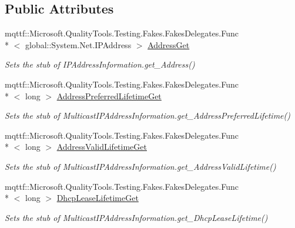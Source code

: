 \subsection*{Public Attributes}
\begin{DoxyCompactItemize}
\item 
mqttf\-::\-Microsoft.\-Quality\-Tools.\-Testing.\-Fakes.\-Fakes\-Delegates.\-Func\\*
$<$ global\-::\-System.\-Net.\-I\-P\-Address $>$ \hyperlink{class_system_1_1_net_1_1_network_information_1_1_fakes_1_1_stub_multicast_i_p_address_information_ae1a3769cede82dc0372388ea52785c37}{Address\-Get}
\begin{DoxyCompactList}\small\item\em Sets the stub of I\-P\-Address\-Information.\-get\-\_\-\-Address()\end{DoxyCompactList}\item 
mqttf\-::\-Microsoft.\-Quality\-Tools.\-Testing.\-Fakes.\-Fakes\-Delegates.\-Func\\*
$<$ long $>$ \hyperlink{class_system_1_1_net_1_1_network_information_1_1_fakes_1_1_stub_multicast_i_p_address_information_a896c7a33c99720be49dcd21db17f0f2e}{Address\-Preferred\-Lifetime\-Get}
\begin{DoxyCompactList}\small\item\em Sets the stub of Multicast\-I\-P\-Address\-Information.\-get\-\_\-\-Address\-Preferred\-Lifetime()\end{DoxyCompactList}\item 
mqttf\-::\-Microsoft.\-Quality\-Tools.\-Testing.\-Fakes.\-Fakes\-Delegates.\-Func\\*
$<$ long $>$ \hyperlink{class_system_1_1_net_1_1_network_information_1_1_fakes_1_1_stub_multicast_i_p_address_information_a99ec36a79f503e67b0bd8b1f383fe56f}{Address\-Valid\-Lifetime\-Get}
\begin{DoxyCompactList}\small\item\em Sets the stub of Multicast\-I\-P\-Address\-Information.\-get\-\_\-\-Address\-Valid\-Lifetime()\end{DoxyCompactList}\item 
mqttf\-::\-Microsoft.\-Quality\-Tools.\-Testing.\-Fakes.\-Fakes\-Delegates.\-Func\\*
$<$ long $>$ \hyperlink{class_system_1_1_net_1_1_network_information_1_1_fakes_1_1_stub_multicast_i_p_address_information_acd465f43a526ba33b00d37da8e61f489}{Dhcp\-Lease\-Lifetime\-Get}
\begin{DoxyCompactList}\small\item\em Sets the stub of Multicast\-I\-P\-Address\-Information.\-get\-\_\-\-Dhcp\-Lease\-Lifetime()\end{DoxyCompactList}\item 

\end{DoxyCompactItemize}
